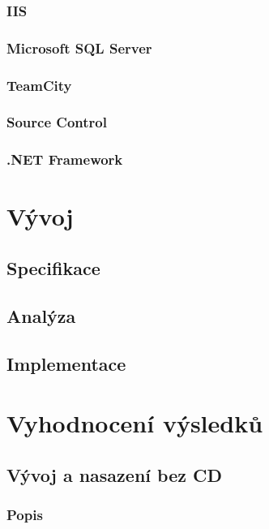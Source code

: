 \subsection{IIS}

\subsection{Microsoft SQL Server}

\subsection{TeamCity}

\subsection{Source Control}

\subsection{.NET Framework}

\chapter{Vývoj}

\section{Specifikace}

\section{Analýza}

\section{Implementace}


\chapter{Vyhodnocení výsledků}

\section{Vývoj a nasazení bez CD}

\subsection{Popis}

